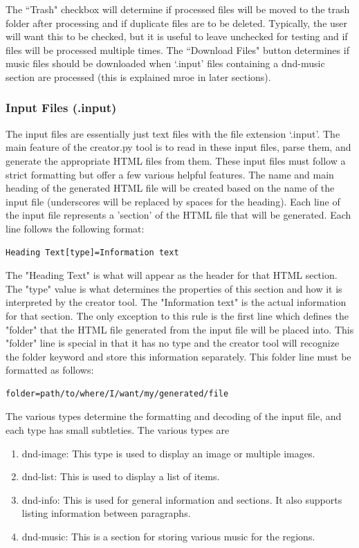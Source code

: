 The ``Trash" checkbox will determine if processed files will be moved to the trash folder after processing and if duplicate files are to be deleted. Typically, the user will want this to be checked, but it is useful to leave unchecked for testing and if files will be processed multiple times. The ``Download Files" button determines if music files should be downloaded when `.input' files containing a dnd-music section are processed (this is explained mroe in later sections).

\subsubsection{Input Files (.input) \label{input files section}}

The input files are essentially just text files with the file extension `.input'. The main feature of the creator.py tool is to read in these input files, parse them, and generate the appropriate HTML files from them. These input files must follow a strict formatting but offer a few various helpful features. The name and main heading of the generated HTML file will be created based on the name of the input file (underscores will be replaced by spaces for the heading). Each line of the input file represents a 'section' of the HTML file that will be generated. Each line follows the following format:
\begin{lstlisting}
Heading Text[type]=Information text
\end{lstlisting}
The "Heading Text" is what will appear as the header for that HTML section. The "type" value is what determines the properties of this section and how it is interpreted by the creator tool. The "Information text" is the actual information for that section. The only exception to this rule is the first line which defines the "folder" that the HTML file generated from the input file will be placed into. This "folder" line is special in that it has no type and the creator tool will recognize the folder keyword and store this information separately. This folder line must be formatted as follows:
\begin{lstlisting}
folder=path/to/where/I/want/my/generated/file
\end{lstlisting}
The various types determine the formatting and decoding of the input file, and each type has small subtleties. The various types are
\begin{enumerate}
	\item dnd-image: This type is used to display an image or multiple images.
 	\item dnd-list: This is used to display a list of items.
 	\item dnd-info: This is used for general information and sections. It also supports listing information between paragraphs.
  	\item dnd-music: This is a section for storing various music for the regions.
\end{enumerate}


